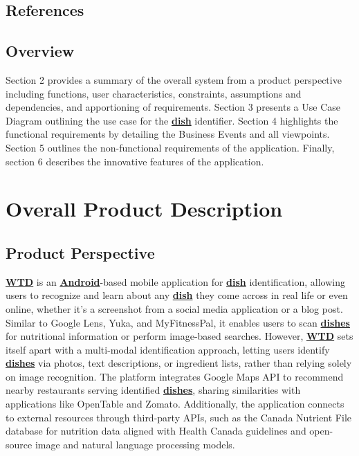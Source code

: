 \documentclass[]{article}
\begin{document}

\subsection{References}
\label{sub:references}

\renewcommand{\refname}{}  %
\vspace{-7mm}  %


\subsection{Overview}
\label{sub:overview}

Section 2 provides a summary of the overall system from a product perspective including functions, user characteristics, constraints, assumptions and dependencies, and apportioning of requirements. 
Section 3 presents a Use Case Diagram outlining the use case for the \hyperref[Dish]{\textbf{dish}} identifier.
Section 4 highlights the functional requirements by detailing the Business Events and all viewpoints.
Section 5 outlines the non-functional requirements of the application.
Finally, section 6 describes the innovative features of the application.


\section{Overall Product Description}
\label{sec:overall_description}

\subsection{Product Perspective}
\label{sub:product_perspective}

\hyperref[WTD]{\textbf{WTD}} is an \hyperref[Android]{\textbf{Android}}-based mobile application for \hyperref[Dish]{\textbf{dish}} identification, allowing users to recognize and learn about any \hyperref[dish]{\textbf{dish}} they come across in real life or even online, whether it's a screenshot from a social media application or a blog post. Similar to Google Lens, Yuka, and MyFitnessPal, it enables users to scan \hyperref[dish]{\textbf{dishes}} for nutritional information or perform image-based searches. However, \hyperref[WTD]{\textbf{WTD}} sets itself apart with a multi-modal identification approach, letting users identify \hyperref[Dish]{\textbf{dishes}} via photos, text descriptions, or ingredient lists, rather than relying solely on image recognition. The platform integrates Google Maps API to recommend nearby restaurants serving identified \hyperref[Dish]{\textbf{dishes}}, sharing similarities with applications like OpenTable and Zomato. Additionally, the application connects to external resources through third-party APIs, such as the Canada Nutrient File database for nutrition data aligned with Health Canada guidelines and open-source image and natural language processing models.
\end{document}
